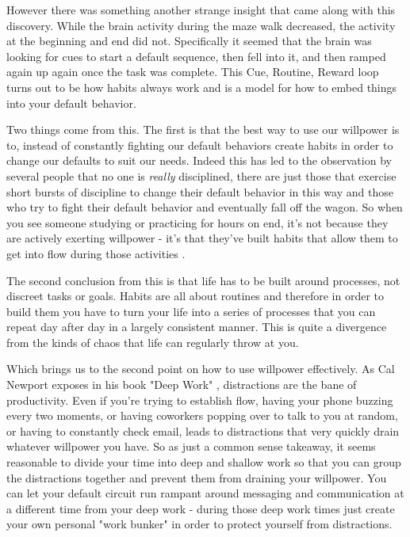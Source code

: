 \documentclass[11pt]{book}
\begin{document}
However there was something another strange insight that came along with this discovery. While the brain activity during the maze walk decreased, the activity at the beginning and end did not. Specifically it seemed that the brain was looking for cues to start a default sequence, then fell into it, and then ramped again up again once the task was complete. This Cue, Routine, Reward loop turns out to be how habits always work \cite{duhigg} and is a model for how to embed things into your default behavior. 
\newline

Two things come from this. The first is that the best way to use our willpower is to, instead of constantly fighting our default behaviors  create habits in order to change our defaults to suit our needs. Indeed this has led to the observation by several people that no one is \textit{really} disciplined, there are just those that exercise short bursts of discipline to change their default behavior in this way and those who try to fight their default behavior and eventually fall off the wagon. So when you see someone studying or practicing for hours on end, it's not because they are actively exerting willpower - it's that they've built habits that allow them to get into flow during those activities \cite{keller}. 
\newline

The second conclusion from this is that life has to be built around processes, not discreet tasks or goals. Habits are all about routines and therefore in order to build them you have to turn your life into a series of processes that you can repeat day after day in a largely consistent manner. This is quite a divergence from the kinds of chaos that life can regularly throw at you.
\newline

Which brings us to the second point on how to use willpower effectively. As Cal Newport exposes in his book "Deep Work" \cite{newport}, distractions are the bane of productivity. Even if you're trying to establish flow, having your phone buzzing every two moments, or having coworkers popping over to talk to you at random, or having to constantly check email, leads to distractions that very quickly drain whatever willpower you have. So as just a common sense takeaway, it seems reasonable to divide your time into deep and shallow work so that you can group the distractions together and prevent them from draining your willpower. You can let your default circuit run rampant around messaging and communication at a different time from your deep work - during those deep work times just create your own personal "work bunker" \cite{newport} in order to protect yourself from distractions.
\newline
\end{document}

